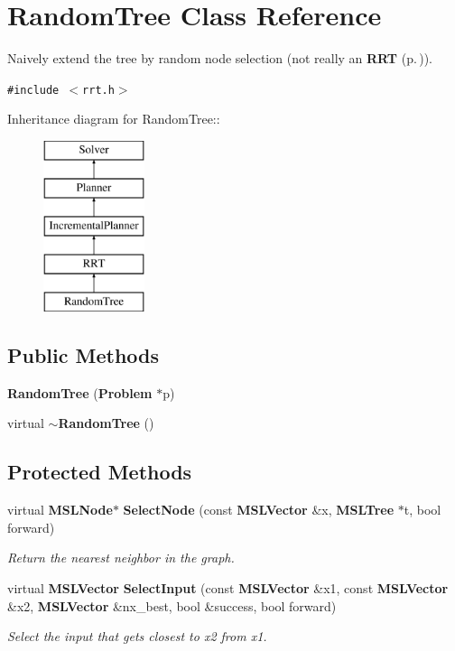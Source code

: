 \section{Random\-Tree  Class Reference}
\label{class_RandomTree}
Naively extend the tree by random node selection (not really an {\bf RRT} {\rm (p.\,\pageref{class_RRT})}). 


{\tt \#include $<$rrt.h$>$}

Inheritance diagram for Random\-Tree::\begin{figure}[H]
\begin{center}
\leavevmode
\includegraphics[height=5cm]{class_RandomTree}
\end{center}
\end{figure}
\subsection*{Public Methods}
\begin{CompactItemize}
\item 
{\bf Random\-Tree} ({\bf Problem} $\ast$p)
\item 
virtual {\bf $\sim$Random\-Tree} ()
\end{CompactItemize}
\subsection*{Protected Methods}
\begin{CompactItemize}
\item 
virtual {\bf MSLNode}$\ast$ {\bf Select\-Node} (const {\bf MSLVector} \&x, {\bf MSLTree} $\ast$t, bool forward)
\begin{CompactList}\small\item\em Return the nearest neighbor in the graph.\item\end{CompactList}\item 
virtual {\bf MSLVector} {\bf Select\-Input} (const {\bf MSLVector} \&x1, const {\bf MSLVector} \&x2, {\bf MSLVector} \&nx\_\-best, bool \&success, bool forward)
\begin{CompactList}\small\item\em Select the input that gets closest to x2 from x1.\item\end{CompactList}\end{CompactItemize}


